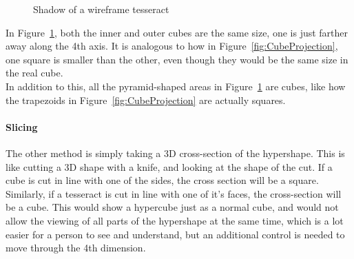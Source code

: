 \documentclass[12pt]{article}
\begin{document}
\begin{figure}
    \centering
    \caption{Shadow of a wireframe tesseract}\label{fig:TesseractProjection}
\end{figure}

In Figure~\ref{fig:TesseractProjection}, both the inner and outer cubes are the same size, one is just farther away along the 4th axis.
It is analogous to how in Figure~\ref{fig:CubeProjection}, one square is smaller than the other, even though they would be the same size in the real cube.\\
In addition to this, all the pyramid-shaped areas in Figure~\ref{fig:TesseractProjection} are cubes, like how the trapezoids in Figure~\ref{fig:CubeProjection} are actually squares.

\paragraph{Slicing}
The other method is simply taking a 3D cross-section of the hypershape. This is like cutting a 3D shape with a knife, and looking at the shape of the cut.
If a cube is cut in line with one of the sides, the cross section will be a square.
Similarly, if a tesseract is cut in line with one of it's faces, the cross-section will be a cube.
This would show a hypercube just as a normal cube, and would not allow the viewing of all parts of the hypershape at the same time, which is a lot easier for a person to see and understand, but an additional control is needed to move through the 4th dimension.
\end{document}
